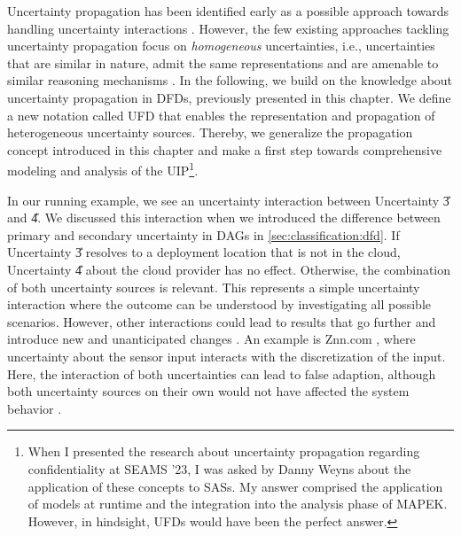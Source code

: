Uncertainty propagation has been identified early as a possible approach towards handling uncertainty interactions \cite{camara_addressing_2022}.
However, the few existing approaches tackling uncertainty propagation focus on \emph{homogeneous} uncertainties, i.e., uncertainties that are similar in nature, admit the same representations and are amenable to similar reasoning mechanisms \cite{camara_uncertainty_2024}.
In the following, we build on the knowledge about uncertainty propagation in \acp{DFD}, previously presented in this chapter.
We define a new notation called \acf{UFD} that enables the representation and propagation of heterogeneous uncertainty sources.
Thereby, we generalize the propagation concept introduced in this chapter and make a first step towards comprehensive modeling and analysis of the \ac{UIP}\footnote{When I presented the research about uncertainty propagation regarding confidentiality at SEAMS '23, I was asked by Danny Weyns about the application of these concepts to \acp{SAS}. My answer comprised the application of models at runtime and the integration into the analysis phase of \acs{MAPEK}. However, in hindsight, \acfp{UFD} would have been the perfect answer.}.

In our running example, we see an uncertainty interaction between Uncertainty \U{3} and \U{4}.
We discussed this interaction when we introduced the difference between primary and secondary uncertainty in \acp{DAG} in \autoref{sec:classification:dfd}.
If Uncertainty \U{3} resolves to a deployment location that is not in the cloud, Uncertainty \U{4} about the cloud provider has no effect.
Otherwise, the combination of both uncertainty sources is relevant.
This represents a simple uncertainty interaction where the outcome can be understood by investigating all possible scenarios.
However, other interactions could lead to results that go further and introduce new and unanticipated changes \cite{camara_addressing_2022,camara_uncertainty_2024}.
An example is Znn.com \cite{cheng_evaluating_2009}, where uncertainty about the sensor input interacts with the discretization of the input.
Here, the interaction of both uncertainties can lead to false adaption, although both uncertainty sources on their own would not have affected the system behavior \cite{camara_uncertainty_2024}.

